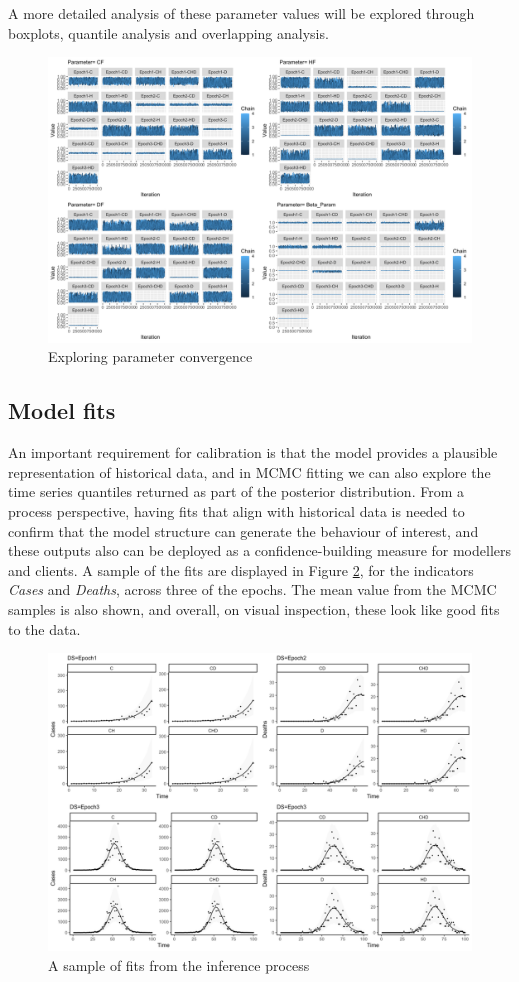 \documentclass[10pt,letterpaper]{article}
\begin{document}
A more detailed analysis of these parameter values will be explored through boxplots, quantile analysis and overlapping analysis.

\begin{figure}
\includegraphics[width=0.85\linewidth]{diagrams/exp_convergence} \caption{Exploring parameter convergence}\label{fig:exp-conv}
\end{figure}

\hypertarget{model-fits}{%
\subsection{Model fits}\label{model-fits}}

An important requirement for calibration is that the model provides a plausible representation of historical data, and in MCMC fitting we can also explore the time series quantiles returned as part of the posterior distribution. From a process perspective, having fits that align with historical data is needed to confirm that the model structure can generate the behaviour of interest, and these outputs also can be deployed as a confidence-building measure for modellers and clients. A sample of the fits are displayed in Figure \ref{fig:exp-fits}, for the indicators \emph{Cases} and \emph{Deaths}, across three of the epochs. The mean value from the MCMC samples is also shown, and overall, on visual inspection, these look like good fits to the data.

\begin{figure}
\includegraphics[width=0.85\linewidth]{diagrams/exp_fits} \caption{A sample of fits from the inference process}\label{fig:exp-fits}
\end{figure}
\end{document}
